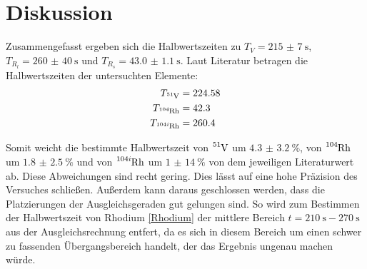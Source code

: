 \section{Diskussion}
\label{sec:Diskussion}

Zusammengefasst ergeben sich die Halbwertszeiten zu $T_V=\SI{215(7)}{\s}$, $T_{R_l}=\SI{260(40)}{\s}$ und $T_{R_s}=\SI{43.0(11)}{\s}$. Laut Literatur \cite{JLab} betragen die Halbwertszeiten der untersuchten Elemente:
\begin{align*}
    T_{\ce{^{51}V}}&=224.58  \\
    T_{\ce{^{104}Rh}}&=42.3  \\
    T_{\ce{^{104i}Rh}}&=260.4
\end{align*}

Somit weicht die bestimmte Halbwertszeit von $\ce{^{51}V}$ um $\SI{4.3(32)}{\percent}$, von $\ce{^{104}Rh}$ um $\SI{1.8(25)}{\percent}$ und von $\ce{^{104i}Rh}$ um $\SI{1(14)}{\percent}$ von dem jeweiligen Literaturwert ab. Diese Abweichungen sind recht gering. Dies lässt auf eine hohe Präzision des Versuches schließen. Außerdem kann daraus geschlossen werden, dass die Platzierungen der Ausgleichsgeraden gut gelungen sind. So wird zum Bestimmen der Halbwertszeit von Rhodium \ref{Rhodium} der mittlere Bereich $t=\SI{210}{\s}-\SI{270}{\s}$ aus der Ausgleichsrechnung entfert, da es sich in diesem Bereich um einen schwer zu fassenden Übergangsbereich handelt, der das Ergebnis ungenau machen würde.



